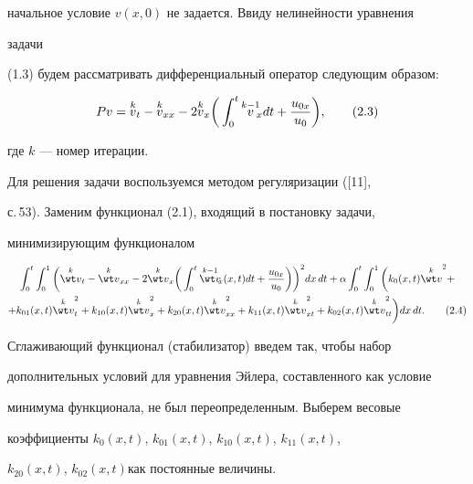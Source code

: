 начальное условие $v(x,0)$ не задается. Ввиду нелинейности уравнения 


задачи 


(1.3) будем рассматривать дифференциальный оператор следующим образом: 


\begin{equation} 


P v=\up{k}{v}_t-\up{k}{v}_{xx}-2\up{k}{v}_x\bigg( 


\int^t_0 \up{k-1}{v}_{\!\!x}dt+\frac{u_{0x}}{u_0}\bigg),\tag{2.3} 


\end{equation} 


где $k$ --- номер итерации. 


 


Для решения задачи воспользуемся методом регуляризации ([11], 


с.\,53). Заменим функционал (2.1), входящий в постановку задачи, 


минимизирующим функционалом 


\begin{multline} 


\int^t_0\int^1_0\bigg(\up{k}{\wt v}_t-\up{k}{\wt v}_{xx}- 


2\up{k}{\wt v}_x\bigg(\int^t_0 \up{k-1}{\wt v}_{\!\!x}(x,t)dt 


+\frac{u_{0x}}{u_0}\bigg)\bigg)^2dx\,dt+\alpha\int^t_0\int^1_0 


\bigg(k_0(x,t){\up{k}{\wt v}}^2+ \\ 


% 


+k_{01}(x,t){\up{k}{\wt v}}^2_t+k_{10}(x,t) 


{\up{k}{\wt v}}^2_x+k_{20}(x,t){\up{k}{\wt v}}^2_{xx}+ 


k_{11}(x,t){\up{k}{\wt v}}^2_{xt}+k_{02}(x,t) 


{\up{k}{\wt v}}^2_{tt}\bigg)dx\,dt.\tag{2.4} 


\end{multline} 


Сглаживающий функционал (стабилизатор) введем так, чтобы набор 


дополнительных условий для уравнения Эйлера, составленного как условие 


минимума функционала, не был переопределенным. Выберем весовые 


коэффициенты $k_{0}(x,t)$, $k_{01}(x,t)$, $k_{10}(x,t)$, $k_{11}(x,t)$, 


$k_{20}(x,t)$, $k_{02}(x,t)$\linebreak как постоянные величины. 



